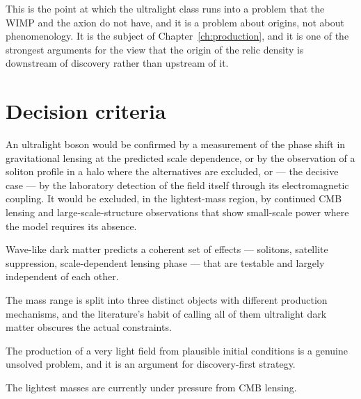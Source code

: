 This is the point at which the ultralight class runs into a problem that the
WIMP and the axion do not have, and it is a problem about origins, not
about phenomenology. It is the subject of Chapter~\ref{ch:production}, and it
is one of the strongest arguments for the view that the origin of the relic
density is downstream of discovery rather than upstream of it.

\section{Decision criteria}An ultralight boson would be confirmed by a
measurement of the phase shift in gravitational lensing at the predicted
scale dependence, or by the observation of a soliton profile in a halo where
the alternatives are excluded, or --- the decisive case --- by the
laboratory detection of the field itself through its electromagnetic
coupling. It would be excluded, in the lightest-mass region, by continued
CMB lensing and large-scale-structure observations that show small-scale
power where the model requires its absence.

\begin{keytakeaways}
\item Wave-like dark matter predicts a coherent set of effects --- solitons,
satellite suppression, scale-dependent lensing phase --- that are testable
and largely independent of each other.
\item The mass range is split into three distinct objects with different
production mechanisms, and the literature's habit of calling all of them
ultralight dark matter obscures the actual constraints.
\item The production of a very light field from plausible initial conditions
is a genuine unsolved problem, and it is an argument for discovery-first
strategy.
\item The lightest masses are currently under pressure from CMB lensing.
\end{keytakeaways}
